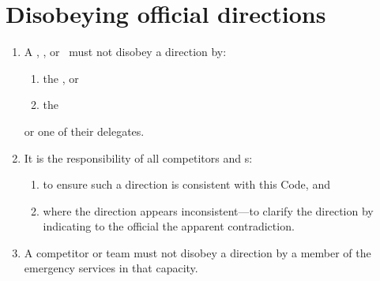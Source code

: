 \documentclass[12pt]{report}
\begin{document}
  \section{Disobeying official directions}\label{sec:disobeyofficial}
  \begin{enumerate}
    \item A \competitor, \team, or \spectator\ must not disobey a direction by:
    \begin{enumerate}
      \item the \RaceDirector, or
      \item the \Referee
    \end{enumerate}
    or one of their delegates.

    \item It is the responsibility of all competitors and \team s:
    \begin{enumerate}
      \item to ensure such a direction is consistent with this Code,
      and
      \item where the direction appears inconsistent---to clarify the direction by indicating to the official the apparent contradiction.
    \end{enumerate}
    \item A competitor or team must not disobey a direction by a member of the emergency services in that capacity.

  \end{enumerate}
\end{document}
